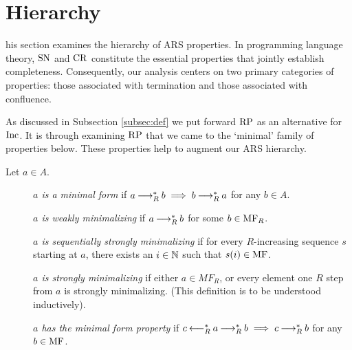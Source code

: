 \section{Hierarchy}
\label{sec:Hierarchy}

\newenvironment{counterexample}[1][]{%
    \refstepcounter{CEcounter} %
    \noindent \scriptsize\textbf{{\theCEcounter } }  #1\par
}

This section examines the hierarchy of ARS properties.
In programming language theory, $\mathrm{SN}$ and $\mathrm{CR}$ constitute the essential properties that
jointly establish completeness.
Consequently, our analysis centers on two primary categories of properties: those associated
with termination and those associated with confluence.

As discussed in Subsection \ref{subsec:def} we put forward $\mathrm{RP}$ as an alternative for $\mathrm{Inc}$. It is through examining $\mathrm{RP}$ that
we came to the `minimal' family of properties below. These properties help to augment our ARS hierarchy.

\begin{definition}\label{def:mf} Let $a \in A$. \hfill
    \begin{description}
        \item[] \emph{$a$ is a minimal form} if $a \mathbin{\longrightarrow_R^*} b \implies b \mathbin{\longrightarrow_R^*} a$ for any $b \in A$.
        \item[] \emph{$a$ is weakly minimalizing} if $a \mathbin{\longrightarrow_R^*} b$ for some $b \in \mathrm{MF}_R$.
        \item[] \emph{$a$ is sequentially strongly minimalizing} if for every $R$-increasing sequence $s$ starting at $a$, there exists
        an $i \in \mathbb{N}$ such that $s (i) \in \mathrm{MF}$.
        \item[]  \emph{$a$ is strongly minimalizing} if either $a \in MF_R$, or every element one $R$ step from $a$ is strongly minimalizing. (This
        definition is to be understood inductively).
        \item[] \emph{$a$ has the minimal form property} if $c \mathbin{\longleftarrow_R^*} a \mathbin{\longrightarrow_R^*} b \implies c \mathbin{\longrightarrow_R^*} b$ for any $b \in \mathrm{MF}$.
    \end{description}
\end{definition}

